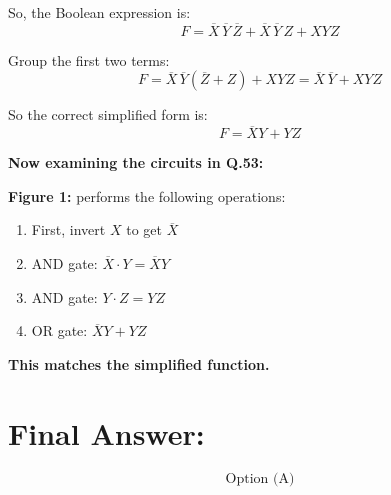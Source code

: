 \documentclass[a4paper,12pt]{article}
\begin{document}
So, the Boolean expression is:
\[
F = \overline{X} \, \overline{Y} \, \overline{Z} + \overline{X} \, \overline{Y} \, Z + X Y Z
\]

Group the first two terms:
\[
F = \overline{X} \, \overline{Y} (\overline{Z} + Z) + X Y Z = \overline{X} \, \overline{Y} + X Y Z
\]

So the correct simplified form is:
\[
\boxed{F = \overline{X} Y + Y Z}
\]

\textbf{Now examining the circuits in Q.53:}

\textbf{Figure 1:} performs the following operations:
\begin{enumerate}
    \item First, invert \( X \) to get \( \overline{X} \)
    \item AND gate: \( \overline{X} \cdot Y = \overline{X} Y \)
    \item AND gate: \( Y \cdot Z = Y Z \)
    \item OR gate: \( \overline{X} Y + Y Z \)
\end{enumerate}
\textbf{This matches the simplified function.}

\section*{Final Answer:}
\[
\boxed{\text{Option (A)}}
\]
\end{document}
